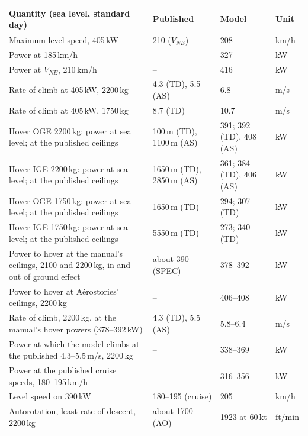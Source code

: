 \begin{tabularx}{\textwidth}{@{}X l l l@{}}
\toprule
Quantity (sea level, standard day) & Published & Model & Unit \\
\midrule
Maximum level speed, 405\,kW & 210 ($V_{NE}$) & 208 & km/h \\
Power at 185\,km/h & -- & 327 & kW \\
Power at $V_{NE}$, 210\,km/h & -- & 416 & kW \\
Rate of climb at 405\,kW, 2200\,kg & 4.3 (TD), 5.5 (AS) & 6.8 & m/s \\
Rate of climb at 405\,kW, 1750\,kg & 8.7 (TD) & 10.7 & m/s \\
Hover OGE 2200\,kg: power at sea level; at the published ceilings & 100\,m (TD), 1100\,m (AS) & 391; 392 (TD), 408 (AS) & kW \\
Hover IGE 2200\,kg: power at sea level; at the published ceilings & 1650\,m (TD), 2850\,m (AS) & 361; 384 (TD), 406 (AS) & kW \\
Hover OGE 1750\,kg: power at sea level; at the published ceilings & 1650\,m (TD) & 294; 307 (TD) & kW \\
Hover IGE 1750\,kg: power at sea level; at the published ceilings & 5550\,m (TD) & 273; 340 (TD) & kW \\
Power to hover at the manual's ceilings, 2100 and 2200\,kg, in and out of ground effect & about 390 (SPEC) & 378--392 & kW \\
Power to hover at A\'erostories' ceilings, 2200\,kg & -- & 406--408 & kW \\
Rate of climb, 2200\,kg, at the manual's hover powers (378--392\,kW) & 4.3 (TD), 5.5 (AS) & 5.8--6.4 & m/s \\
Power at which the model climbs at the published 4.3--5.5\,m/s, 2200\,kg & -- & 338--369 & kW \\
Power at the published cruise speeds, 180--195\,km/h & -- & 316--356 & kW \\
Level speed on 390\,kW & 180--195 (cruise) & 205 & km/h \\
Autorotation, least rate of descent, 2200\,kg & about 1700 (AO) & 1923 at 60\,kt & ft/min \\
\bottomrule
\end{tabularx}
